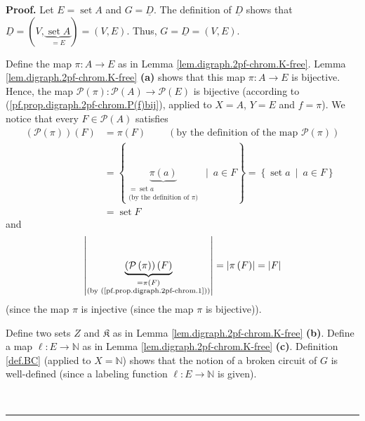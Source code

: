 \documentclass[numbers=enddot,12pt,final,onecolumn,notitlepage]{scrartcl}%
\theoremstyle{definition}
\newenvironment{proof}[1][Proof]{\noindent\textbf{#1.} }{\ \rule{0.5em}{0.5em}}
\newenvironment{verlong}{}{}
\begin{document}
\begin{verlong}
\begin{proof}
Let $E=\operatorname*{set}A$ and $G=\underline{D}$. The definition of
$\underline{D}$ shows that $\underline{D}=\left(
V,\underbrace{\operatorname*{set}A}_{=E}\right)  =\left(  V,E\right)  $. Thus,
$G=\underline{D}=\left(  V,E\right)  $.

Define the map $\pi:A\rightarrow E$ as in Lemma
\ref{lem.digraph.2pf-chrom.K-free}. Lemma \ref{lem.digraph.2pf-chrom.K-free}
\textbf{(a)} shows that this map $\pi:A\rightarrow E$ is bijective. Hence, the
map $\mathcal{P}\left(  \pi\right)  :\mathcal{P}\left(  A\right)
\rightarrow\mathcal{P}\left(  E\right)  $ is bijective (according to
(\ref{pf.prop.digraph.2pf-chrom.P(f)bij}), applied to $X=A$, $Y=E$ and $f=\pi
$). We notice that every $F\in\mathcal{P}\left(  A\right)  $ satisfies%
\begin{align}
\left(  \mathcal{P}\left(  \pi\right)  \right)  \left(  F\right)   &
=\pi\left(  F\right)  \ \ \ \ \ \ \ \ \ \ \left(  \text{by the definition of
the map }\mathcal{P}\left(  \pi\right)  \right)
\label{pf.prop.digraph.2pf-chrom.1}\\
&  =\left\{  \underbrace{\pi\left(  a\right)  }%
_{\substack{=\operatorname*{set}a\\\text{(by the definition of }\pi\text{)}%
}}\ \mid\ a\in F\right\}  =\left\{  \operatorname*{set}a\ \mid\ a\in F\right\}
\nonumber\\
&  =\operatorname*{set}F \label{pf.prop.digraph.2pf-chrom.2}%
\end{align}
and%
\begin{equation}
\left\vert \underbrace{\left(  \mathcal{P}\left(  \pi\right)  \right)  \left(
F\right)  }_{\substack{=\pi\left(  F\right)  \\\text{(by
(\ref{pf.prop.digraph.2pf-chrom.1}))}}}\right\vert =\left\vert \pi\left(
F\right)  \right\vert =\left\vert F\right\vert
\label{pf.prop.digraph.2pf-chrom.4}%
\end{equation}
(since the map $\pi$ is injective (since the map $\pi$ is bijective)).

Define two sets $Z$ and $\mathfrak{K}$ as in Lemma
\ref{lem.digraph.2pf-chrom.K-free} \textbf{(b)}. Define a map $\ell
:E\rightarrow\mathbb{N}$ as in Lemma \ref{lem.digraph.2pf-chrom.K-free}
\textbf{(c)}. Definition \ref{def.BC} (applied to $X=\mathbb{N}$) shows that
the notion of a broken circuit of $G$ is well-defined (since a labeling
function $\ell:E\rightarrow\mathbb{N}$ is given).


\end{proof}
\end{verlong}
\end{document}
